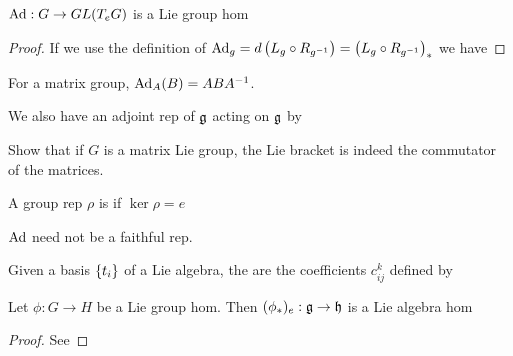 \documentclass{article}
\begin{document}
\begin{prop}
	$\operatorname{Ad} : G \to GL(T_e G)$ is a Lie group hom
\end{prop}
\begin{proof}
If we use the definition of $\operatorname{Ad}_g = d\left( L_g \circ R_{g^{-1}} \right) =\left( L_g \circ R_{g^{-1}} \right)_\ast$ we have 
\end{proof}

\begin{lemma}
For a matrix group, $\operatorname{Ad}_A(B) = ABA^{-1}$. 
\end{lemma}

\begin{definition}
We also have an adjoint rep of $\mathfrak{g}$ acting on $\mathfrak{g}$ by 
\end{definition}

\begin{ex}
	Show that if $G$ is a matrix Lie group, the Lie bracket is indeed the commutator of the matrices. 
\end{ex}

\begin{definition}
	A group rep $\rho$ is  if $\ker \rho = e$
\end{definition}

\begin{fact}
	$\operatorname{Ad}$ need not be a faithful rep. 
\end{fact}

\begin{definition}
	Given a basis $\left\{ t_i \right\}$ of a Lie algebra, the  are the coefficients $c_{ij}^k$ defined by 
\end{definition}

\begin{prop}
	Let $\phi:G \to H$ be a Lie group hom. Then $(\phi_\ast)_e : \mathfrak{g} \to \mathfrak{h}$ is a Lie algebra hom
\end{prop}
\begin{proof}
	See 
\end{proof}
\end{document}

